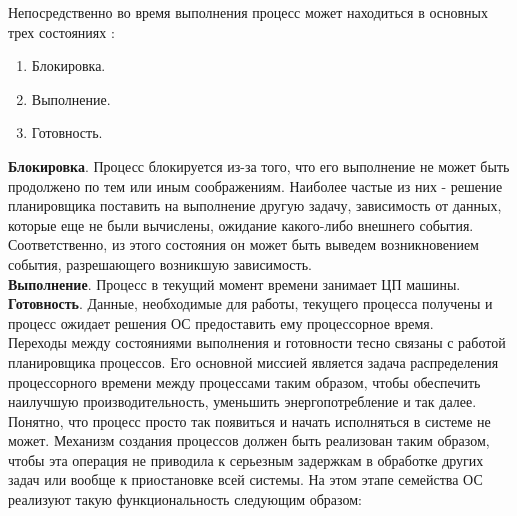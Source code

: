 Непосредственно во время выполнения процесс может находиться в основных трех состояниях \cite{tanenbaum}: 
\begin{enumerate}[label=---]
\item Блокировка.
\item Выполнение.
\item Готовность.
\end{enumerate}
\textbf{Блокировка}. Процесс блокируется из-за того, что его выполнение не может быть продолжено по тем или иным соображениям. Наиболее частые из них - решение планировщика поставить на выполнение другую задачу, зависимость от данных, которые еще не были вычислены, ожидание какого-либо внешнего события. Соответственно, из этого состояния он может быть выведем возникновением события, разрешающего возникшую зависимость.\\
\textbf{Выполнение}. Процесс в текущий момент времени занимает ЦП машины.\\
\textbf{Готовность}. Данные, необходимые для работы, текущего процесса получены и процесс ожидает решения ОС предоставить ему процессорное время.\\
Переходы между состояниями выполнения и готовности тесно связаны с работой планировщика процессов. Его   основной миссией является задача распределения процессорного времени между процессами таким образом, чтобы обеспечить наилучшую производительность, уменьшить энергопотребление и так далее.\\
Понятно, что процесс просто так появиться и начать исполняться в системе не может. Механизм создания процессов должен быть реализован таким образом, чтобы эта операция не приводила к серьезным задержкам в обработке других задач или вообще к приостановке всей системы. На этом этапе семейства ОС реализуют такую функциональность следующим образом:\\
